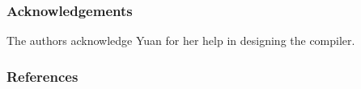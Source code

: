 \documentclass[twoside]{article}
\begin{document}
%
%
%
%
%

\subsubsection*{Acknowledgements}

The authors acknowledge Yuan for her help in designing the compiler. 

\subsubsection*{References}


\end{document}
